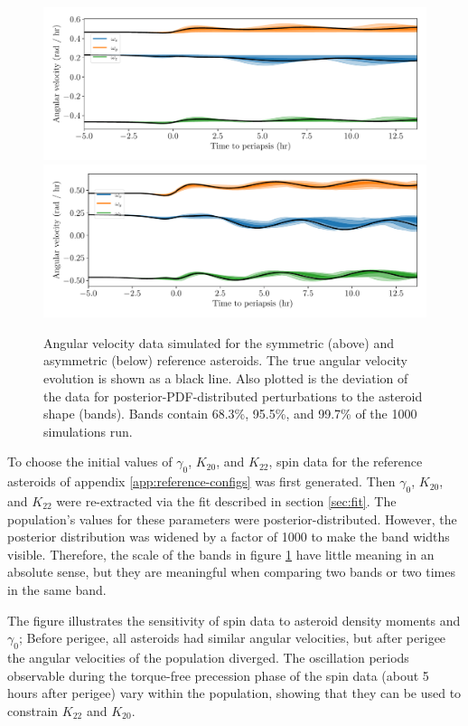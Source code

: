 \documentclass[fleqn,usenatbib]{mnras}
\begin{document}
\begin{figure}
  \centering
  \includegraphics[width=0.7\linewidth]{figs/nominal-data-sym.pdf}
  \includegraphics[width=0.7\linewidth]{figs/nominal-data-asym.pdf}
  \caption{Angular velocity data simulated for the symmetric (above) and asymmetric (below) reference asteroids. The true angular velocity evolution is shown as a black line. Also plotted is the deviation of the data for posterior-PDF-distributed perturbations to the asteroid shape (bands). Bands contain 68.3\%, 95.5\%, and 99.7\% of the 1000 simulations run.}
  \label{fig:example-data}
\end{figure}

To choose the initial values of $\gamma_0$, $K_{20}$, and $K_{22}$, spin data for the reference asteroids of appendix \ref{app:reference-configs} was first generated. Then $\gamma_0$, $K_{20}$, and $K_{22}$ were re-extracted via the fit described in section \ref{sec:fit}. The population's values for these parameters were posterior-distributed. However, the posterior distribution was widened by a factor of 1000 to make the band widths visible. Therefore, the scale of the bands in figure \ref{fig:example-data} have little meaning in an absolute sense, but they are meaningful when comparing two bands or two times in the same band.

The figure illustrates the sensitivity of spin data to asteroid density moments and $\gamma_0$; Before perigee, all asteroids had similar angular velocities, but after perigee the angular velocities of the population diverged. The oscillation periods observable during the torque-free precession phase of the spin data (about 5 hours after perigee) vary within the population, showing that they can be used to constrain $K_{22}$ and $K_{20}$.
\end{document}
